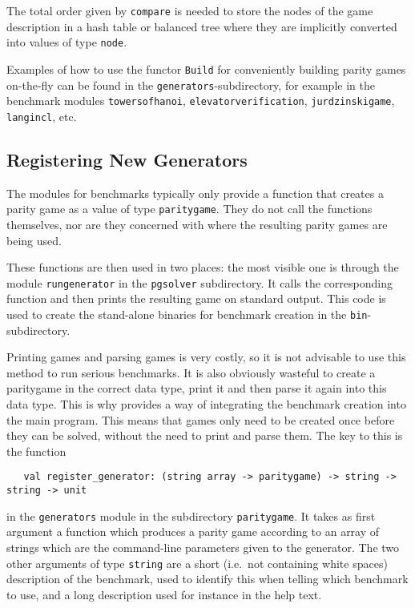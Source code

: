 The total order given by \verb#compare# is needed to store the nodes of the game description in a hash table or balanced
tree where they are implicitly converted into values of type \verb#node#.

Examples of how to use the functor \verb#Build# for conveniently building parity games on-the-fly can be found in the
\texttt{generators}-subdirectory, for example in the benchmark modules \texttt{towersofhanoi}, \texttt{elevatorverification},
\texttt{jurdzinskigame}, \texttt{langincl}, etc.

\subsection{Registering New Generators}

The modules for benchmarks typically only provide a function that creates a parity game as a value of type \verb#paritygame#.
They do not call the functions themselves, nor are they concerned with where the resulting parity games are being used.

These functions are then used in two places: the most visible one is through the module \texttt{rungenerator} in the 
\texttt{pgsolver} subdirectory. It calls the corresponding function and then prints the resulting game on standard output.
This code is used to create the stand-alone binaries for benchmark creation in the \texttt{bin}-subdirectory.

Printing games and parsing games is very costly, so it is not advisable to use this method to run serious benchmarks. It is
also obviously wasteful to create a paritygame in the correct data type, print it and then parse it again into this data type.
This is why \pgsolver provides a way of integrating the benchmark creation into the main program. This means that games only
need to be created once before they can be solved, without the need to print and parse them. The key to this is the function
\begin{verbatim}
   val register_generator: (string array -> paritygame) -> string -> string -> unit
\end{verbatim}
in the \texttt{generators} module in the subdirectory \texttt{paritygame}. It takes as first argument a function which 
produces a parity game according to an array of strings which are the command-line parameters given to the generator. The
two other arguments of type \verb#string# are a short (i.e.\ not containing white spaces) description of the benchmark,
used to identify this when telling \pgsolver which benchmark to use, and a long description used for instance in the help
text. 

